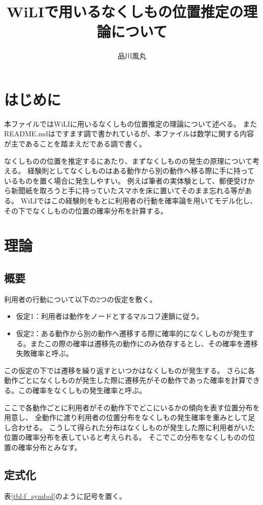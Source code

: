 \documentclass{jarticle}
\title{WiLIで用いるなくしもの位置推定の理論について}
\author{品川風丸}
\numberwithin{equation}{section}
\numberwithin{table}{section}
\numberwithin{figure}{section}
\theoremstyle{plain}
\begin{document}
\maketitle

\section{はじめに}
本ファイルではWiLIに用いるなくしもの位置推定の理論について述べる。
またREADME.mdはですます調で書かれているが、本ファイルは数学に関する内容が主であることを踏まえだである調で書く。

なくしものの位置を推定するにあたり、まずなくしものの発生の原理について考える。
経験則としてなくしものはある動作から別の動作へ移る際に手に持っているものを置く場合に発生しやすい。
例えば筆者の実体験として、郵便受けから新聞紙を取ろうと手に持っていたスマホを床に置いてそのまま忘れる等がある。
WiLIではこの経験則をもとに利用者の行動を確率論を用いてモデル化し、その下でなくしものの位置の確率分布を計算する。


\section{理論}

\subsection{概要}
利用者の行動について以下の2つの仮定を敷く。
\begin{itemize}
    \item 仮定1：利用者は動作をノードとするマルコフ連鎖に従う。
    \item 仮定2：ある動作から別の動作へ遷移する際に確率的になくしものが発生する。またこの際の確率は遷移先の動作にのみ依存するとし、その確率を遷移失敗確率と呼ぶ。
\end{itemize}
この仮定の下では遷移を繰り返すといつかはなくしものが発生する。
さらに各動作ごとになくしものが発生した際に遷移先がその動作であった確率を計算できる。この確率をなくしもの発生確率と呼ぶ。

ここで各動作ごとに利用者がその動作下でどこにいるかの傾向を表す位置分布を用意し、
全動作に渡り利用者の位置分布をなくしもの発生確率を重みとして足し合わせる。
こうして得られた分布はなくしものが発生した際に利用者がいた位置の確率分布を表していると考えられる。
そこでこの分布をなくしものの位置の確率分布とみなす。


\subsection{定式化}
表\ref{tbl:f_symbol}のように記号を置く。
\end{document}
